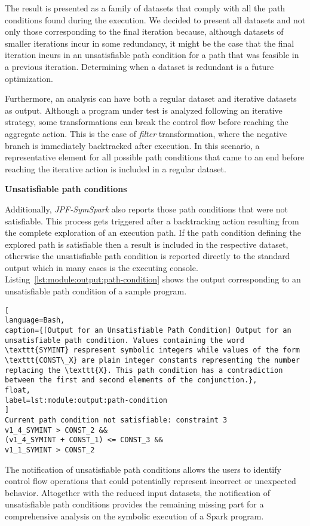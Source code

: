 The result is presented as a family of datasets that comply with all the path conditions found during the execution. We decided to present all datasets and not only those corresponding to the final iteration because, although datasets of smaller iterations incur in some redundancy, it might be the case that the final iteration incurs in an unsatisfiable path condition for a path that was feasible in a previous iteration. Determining when a dataset is redundant is a future optimization.

Furthermore, an analysis can have both a regular dataset and iterative datasets as output. Although a program under test is analyzed following an iterative strategy, some transformations can break the control flow before reaching the aggregate action. This is the case of \textit{filter} transformation, where the negative branch is immediately backtracked after execution. In this scenario, a representative element for all possible path conditions that came to an end before reaching the iterative action is included in a regular dataset.

\textbf{Unsatisfiable path conditions}

Additionally, \textit{JPF-SymSpark} also reports those path conditions that were not satisfiable. This process gets triggered after a backtracking action resulting from the complete exploration of an execution path. If the path condition defining the explored path is satisfiable then a result is included in the respective dataset, otherwise the unsatisfiable path condition is reported directly to the standard output which in many cases is the executing console. Listing~\ref{lst:module:output:path-condition} shows the output corresponding to an unsatisfiable path condition of a sample program.

\begin{lstlisting}[
language=Bash,
caption={[Output for an Unsatisfiable Path Condition] Output for an unsatisfiable path condition. Values containing the word \texttt{SYMINT} respresent symbolic integers while values of the form \texttt{CONST\_X} are plain integer constants representing the number replacing the \texttt{X}. This path condition has a contradiction between the first and second elements of the conjunction.},
float,
label=lst:module:output:path-condition
]
Current path condition not satisfiable: constraint 3
v1_4_SYMINT > CONST_2 &&
(v1_4_SYMINT + CONST_1) <= CONST_3 &&
v1_1_SYMINT > CONST_2
\end{lstlisting}

The notification of unsatisfiable path conditions allows the users to identify control flow operations that could potentially represent incorrect or unexpected behavior. Altogether with the reduced input datasets, the notification of unsatisfiable path conditions provides the remaining missing part for a comprehensive analysis on the symbolic execution of a Spark program.